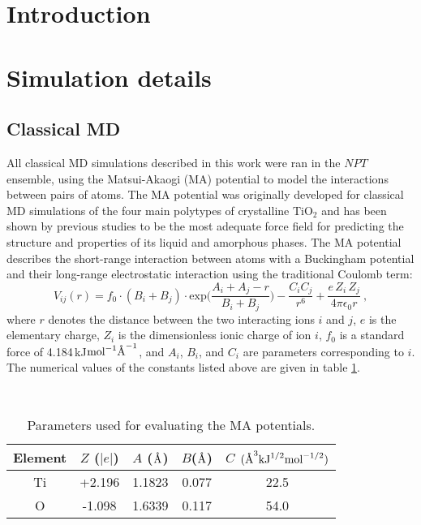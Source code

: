 \documentclass[preprint,aps,draft]{revtex4}
\newcommand{\angstrom}{\text{\normalfont\AA}}
\newcommand\tab[1][1cm]{\hspace*{#1}} %
\begin{document}
\section*{Introduction} 

\section*{Simulation details}

\subsection*{Classical MD}

\tab All classical MD simulations described in this work were ran in the $NPT$ ensemble, using the Matsui-Akaogi (MA) potential to model the interactions between pairs of atoms.
The MA potential was originally developed for classical MD simulations of the four main polytypes of crystalline $\text{TiO}_2$ and has been shown by previous studies to be the most adequate force field for predicting the structure and properties of its liquid and amorphous phases.
The MA potential describes the short-range interaction between atoms with a Buckingham potential and their long-range electrostatic interaction using the traditional Coulomb term:
\begin{equation}
V_{ij}(r) = f_{0}\cdot (B_i+B_j)\cdot\text{exp}\big(\frac{A_i + A_j - r}{B_i + B_j}\big) - \frac{C_{i}C_j}{r^6} + \frac{e\,Z_i\,Z_j}{4\pi\epsilon_0 r}\: ,
\end{equation}
where $r$ denotes the distance between the two interacting ions $i$ and $j$, $e$ is the elementary charge, $Z_i$ is the dimensionless ionic charge of ion $i$, $f_0$ is a standard force of 4.184$\,$kJ$\text{mol}^{-1}\angstrom^{-1}$, and $A_i$, $B_i$, and $C_i$ are parameters corresponding to $i$.
The numerical values of the constants listed above are given in table \ref{classpot}.

\begin{table}[]
\centering
\caption{Parameters used for evaluating the MA potentials.}
\label{classpot}
\
\begin{tabular}{ccccc}
\hline
Element & $Z$ ($|e|$) & $A$ ($\angstrom$) & $B$($\angstrom$) & $C$ $(\angstrom^3\text{kJ}^{1/2}\text{mol}^{-1/2})$ \\ \hline
Ti      & +2.196      & 1.1823            & 0.077            & 22.5                                                \\
O       & -1.098      & 1.6339            & 0.117            & 54.0                                                \\ \hline
\end{tabular}
\end{table}
\end{document}
